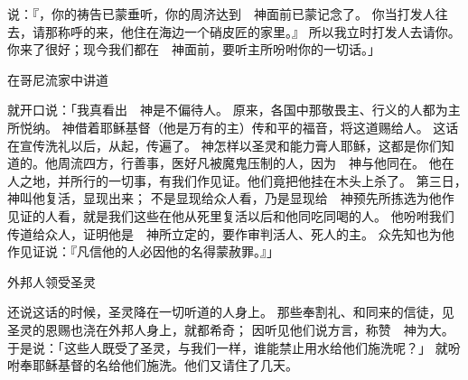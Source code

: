 {说：『{}，你的祷告已蒙垂听，你的周济达到　神面前已蒙记念了。
你当打发人往{}去，请那称呼{}的{}来，他住在海边一个硝皮匠{}的家里。』
所以我立时打发人去请你。你来了很好；现今我们都在　神面前，要听主所吩咐你的一切话。」
\par }{\SH 在哥尼流家中讲道
\par }{\PP {}就开口说：「我真看出　神是不偏待人。
原来，各国中那敬畏主、行义的人都为主所悦纳。
神借着耶稣基督（他是万有的主）传和平的福音，将这道赐给{}人。
这话在{}宣传洗礼以后，从{}起，传遍了{}。
神怎样以圣灵和能力膏{}人耶稣，这都是你们知道的。他周流四方，行善事，医好凡被魔鬼压制的人，因为　神与他同在。
他在{}人之地，并{}所行的一切事，有我们作见证。他们竟把他挂在木头上杀了。
第三日，　神叫他复活，显现出来；
不是显现给众人看，乃是显现给　神预先所拣选为他作见证的人看，就是我们这些在他从死里复活以后和他同吃同喝的人。
他吩咐我们传道给众人，证明他是　神所立定的，要作审判活人、死人的主。
众先知也为他作见证说：『凡信他的人必因他的名得蒙赦罪。』」
\par }{\SH 外邦人领受圣灵
\par }{\PP {}还说这话的时候，圣灵降在一切听道的人身上。
那些奉割礼、和{}同来的信徒，见圣灵的恩赐也浇在外邦人身上，就都希奇；
因听见他们说方言，称赞　神为大。
于是{}说：「这些人既受了圣灵，与我们一样，谁能禁止用水给他们施洗呢？」
就吩咐奉耶稣基督的名给他们施洗。他们又请{}住了几天。

}
